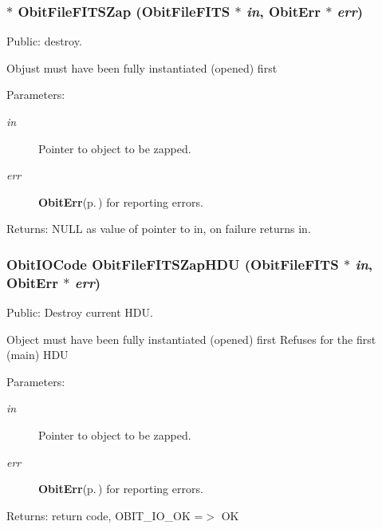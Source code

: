 \subsubsection{$\ast$ Obit\-File\-FITSZap ({\bf Obit\-File\-FITS} $\ast$ {\em in}, {\bf Obit\-Err} $\ast$ {\em err})}\label{ObitFileFITS_8c_a11}


Public: destroy. 

Objust must have been fully instantiated (opened) first \begin{Desc}
\item[Parameters:]
\begin{description}
\item[{\em in}]Pointer to object to be zapped. \item[{\em err}]{\bf Obit\-Err}{\rm (p.\,\pageref{structObitErr})} for reporting errors. \end{description}
\end{Desc}
\begin{Desc}
\item[Returns:]NULL as value of pointer to in, on failure returns in. \end{Desc}
\subsubsection{\setlength{\rightskip}{0pt plus 5cm}Obit\-IOCode Obit\-File\-FITSZap\-HDU ({\bf Obit\-File\-FITS} $\ast$ {\em in}, {\bf Obit\-Err} $\ast$ {\em err})}\label{ObitFileFITS_8c_a12}


Public: Destroy current HDU. 

Object must have been fully instantiated (opened) first Refuses for the first (main) HDU \begin{Desc}
\item[Parameters:]
\begin{description}
\item[{\em in}]Pointer to object to be zapped. \item[{\em err}]{\bf Obit\-Err}{\rm (p.\,\pageref{structObitErr})} for reporting errors. \end{description}
\end{Desc}
\begin{Desc}
\item[Returns:]return code, OBIT\_\-IO\_\-OK =$>$ OK \end{Desc}
